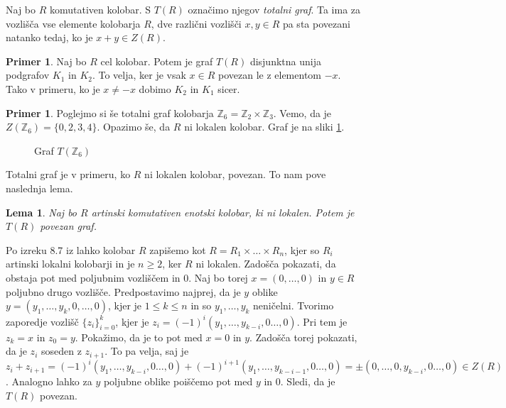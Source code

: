 \documentclass[a4paper, 12pt]{amsart}
\theoremstyle{definition} %
\newtheorem{primer}[definicija]{Primer}
\theoremstyle{plain} %
\newtheorem{lema}[definicija]{Lema}
\newcommand{\Z}{\mathbb Z}
\begin{document}
Naj bo $R$ komutativen kolobar. S $T(R)$ označimo njegov \emph{totalni graf}. Ta ima za vozlišča vse elemente kolobarja $R$, dve različni vozlišči $x,y\in R$ pa sta povezani natanko tedaj, ko je $x+y\in Z(R)$.

\begin{primer}
Naj bo $R$ cel kolobar. Potem je graf $T(R)$ disjunktna unija podgrafov $K_1$ in $K_2$. To velja, ker je vsak $x\in R$ povezan le z elementom $-x$. Tako v primeru, ko je $x\neq -x$  dobimo $K_2$ in $K_1$ sicer. 
\end{primer}

\begin{primer}
Poglejmo si še totalni graf kolobarja $\Z_6 = \Z_2 \times \Z_3$. Vemo, da je $Z(\Z_6) = \{0,2,3,4\}$.  Opazimo še, da $R$ ni lokalen kolobar. Graf je na sliki \ref{T(Z2xZ3)}.
\end{primer}

\begin{figure}[h!]
\centering

\caption{Graf $T(\Z_6)$}
\label{T(Z2xZ3)}
\end{figure}

Totalni graf je v primeru, ko $R$ ni lokalen kolobar, povezan. To nam pove naslednja lema.
\begin{lema}
Naj bo $R$ artinski komutativen enotski kolobar, ki ni lokalen. Potem je $T(R)$ povezan graf.
\end{lema}

\proof
Po izreku 8.7 iz \cite{Atiyah} lahko kolobar $R$ zapišemo kot $R=R_1 \times \dots \times R_n$, kjer so $R_i$ artinski lokalni kolobarji in je $n\ge 2$, ker $R$ ni lokalen. Zadošča pokazati, da obstaja pot med poljubnim vozliščem in 0. Naj bo torej $x=(0,\dots,0)$ in $y\in R$ poljubno drugo vozlišče. Predpostavimo najprej, da je $y$ oblike $y=(y_1,\dots,y_k,0,\dots,0)$, kjer je $1\le k \le n$ in so $y_1,\dots,y_k$ neničelni. Tvorimo zaporedje vozlišč $\{z_i\}_{i=0}^k$, kjer je $z_i = (-1)^i (y_1,\dots, y_{k-i},0\dots,0)$. Pri tem je $z_k = x $ in $z_0 = y$. Pokažimo, da je to pot med $x=0 $ in $y$. Zadošča torej pokazati, da je $z_i $ soseden z $z_{i+1}$. To pa velja, saj je $z_i + z_{i+1} =  (-1)^i (y_1,\dots, y_{k-i},0\dots,0) +  (-1)^{i+1} (y_1,\dots, y_{k-i-1},0\dots,0) = \pm  (0,\dots,0, y_{k-i},0\dots,0)\in Z(R)$. Analogno lahko za $y$ poljubne oblike poiščemo pot med $y$ in $0$. Sledi, da je $T(R)$ povezan.
\end{document}
